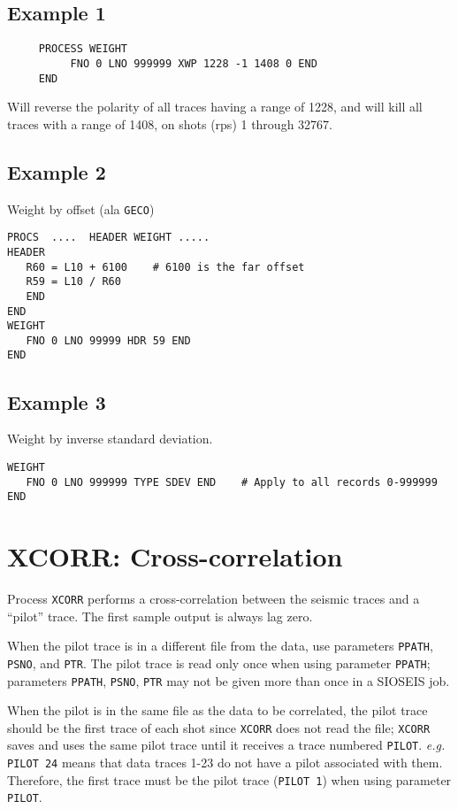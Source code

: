 \subsection{Example 1}
\begin{verbatim}
     PROCESS WEIGHT
          FNO 0 LNO 999999 XWP 1228 -1 1408 0 END
     END
\end{verbatim}
Will reverse the polarity of all traces having a range of 1228, and will
kill all traces with a range of 1408, on \glspl{shot} (\glspl{rp}) 1 through 32767.

\subsection{Example 2}
Weight by offset (ala \texttt{GECO})
\begin{verbatim}
PROCS  ....  HEADER WEIGHT .....
HEADER
   R60 = L10 + 6100    # 6100 is the far offset
   R59 = L10 / R60
   END
END
WEIGHT
   FNO 0 LNO 99999 HDR 59 END
END
\end{verbatim}

\subsection{Example 3}
Weight by inverse standard deviation.
\begin{verbatim}
WEIGHT
   FNO 0 LNO 999999 TYPE SDEV END    # Apply to all records 0-999999
END
\end{verbatim}

\section{XCORR: Cross-correlation}
\label{cmd_xcorr}

Process \texttt{XCORR} performs a cross-correlation between the seismic
traces and a ``pilot'' trace.  The first sample output is always lag zero.

When the pilot trace is in a different file from the data, use
parameters \texttt{PPATH}, \texttt{PSNO}, and \texttt{PTR}.  The pilot trace is read only once
when using parameter \texttt{PPATH}; parameters \texttt{PPATH}, \texttt{PSNO}, \texttt{PTR} may not be
given more than once in a SIOSEIS job.

When the pilot is in the same file as the data to be correlated,
the pilot trace should be the first trace of each \gls{shot} since \texttt{XCORR}
does not read the file; \texttt{XCORR} saves and uses the same pilot trace
until it receives a trace numbered \texttt{PILOT}.  \textit{e.g.} \texttt{PILOT 24} means that
data traces 1-23 do not have a pilot associated with them.  Therefore,
the first trace must be the pilot trace (\texttt{PILOT 1}) when using parameter
\texttt{PILOT}.

